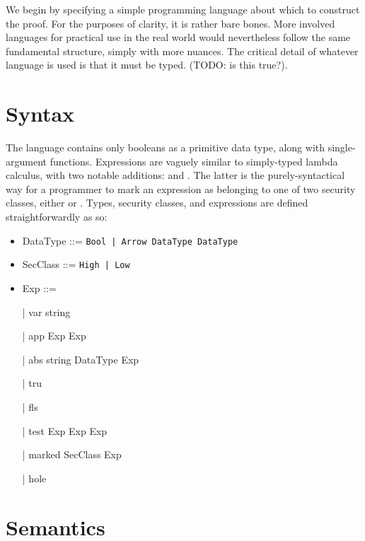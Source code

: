 \documentclass[12pt]{report}
\begin{document}
 We begin by specifying a simple programming language about which
to construct the proof. For the purposes of clarity, it is rather
bare bones. More involved languages for practical use in the real
world would nevertheless follow the same fundamental structure,
simply with more nuances. The critical detail of whatever language is
used is that it must be typed. (TODO: is this true?). \begin{coqdoccode}
\coqdocemptyline
\coqdocemptyline
\end{coqdoccode}
\section{Syntax}



 The language contains only booleans as a primitive data type,
along with single-argument functions. Expressions are vaguely similar
to simply-typed lambda calculus, with two notable additions: 
and . The latter is the purely-syntactical way for
a programmer to mark an expression as belonging to one of two
security classes, either  or . Types, security classes,
and expressions are defined straightforwardly as so: 




\begin{itemize}
\item  DataType ::= \texttt{Bool | Arrow DataType DataType }


\item  SecClass ::= \texttt{High | Low }


\item  Exp ::=


    | var string


    | app Exp Exp


    | abs string DataType Exp


    | tru


    | fls


    | test Exp Exp Exp


    | marked SecClass Exp


    | hole

\end{itemize}
\begin{coqdoccode}
\coqdocemptyline
\coqdocemptyline
\coqdocemptyline
\coqdocemptyline
\coqdocemptyline
\coqdocemptyline
\coqdocemptyline
\end{coqdoccode}
\section{Semantics}
\end{document}
